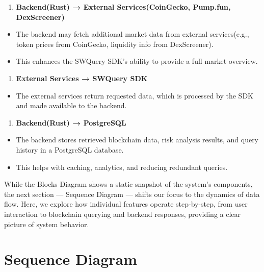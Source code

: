 \documentclass[
]{article}
\providecommand{\tightlist}{%
  \setlength{\itemsep}{0pt}\setlength{\parskip}{0pt}}
\begin{document}
\begin{enumerate}
\def\labelenumi{\arabic{enumi}.}
\setcounter{enumi}{6}
\tightlist
\item
  \textbf{Backend(Rust) → External Services(CoinGecko, Pump.fun,
  DexScreener)}
\end{enumerate}

\begin{itemize}
\tightlist
\item
  The backend may fetch additional market data from external
  services(e.g., token prices from CoinGecko, liquidity info from
  DexScreener).
\item
  This enhances the SWQuery SDK's ability to provide a full market
  overview.
\end{itemize}

\begin{enumerate}
\def\labelenumi{\arabic{enumi}.}
\setcounter{enumi}{7}
\tightlist
\item
  \textbf{External Services → SWQuery SDK}
\end{enumerate}

\begin{itemize}
\tightlist
\item
  The external services return requested data, which is processed by the
  SDK and made available to the backend.
\end{itemize}

\begin{enumerate}
\def\labelenumi{\arabic{enumi}.}
\setcounter{enumi}{8}
\tightlist
\item
  \textbf{Backend(Rust) → PostgreSQL}
\end{enumerate}

\begin{itemize}
\tightlist
\item
  The backend stores retrieved blockchain data, risk analysis results,
  and query history in a PostgreSQL database.
\item
  This helps with caching, analytics, and reducing redundant queries.
\end{itemize}

While the Blocks Diagram shows a static snapshot of the system's components, the next section — Sequence Diagram — shifts our focus to the dynamics of data flow. Here, we explore how individual features operate step-by-step, from user interaction to blockchain querying and backend responses, providing a clear picture of system behavior.

\hypertarget{sequence-diagram}{%
\section{Sequence Diagram}\label{sequence-diagram}}
\end{document}
